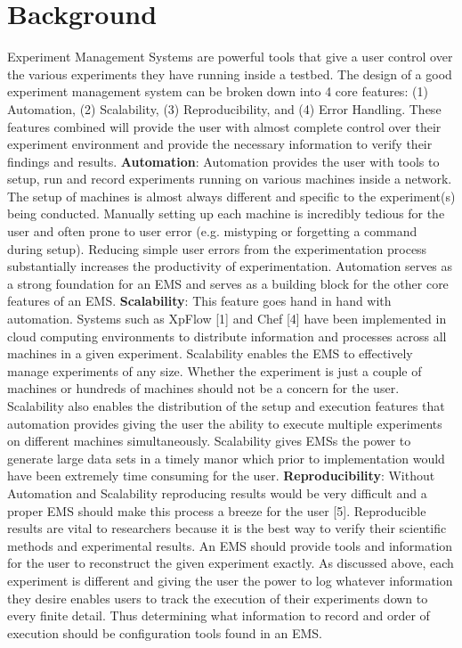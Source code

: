 \documentclass[11pt,twocolumn,letterpaper]{article}
\begin{document}
\section{Background}
Experiment Management Systems are powerful tools that give a user control over the various experiments they have running inside a testbed.  The design of a good experiment management system can be broken down into 4 core features:
(1) Automation, (2) Scalability, (3) Reproducibility, and (4) Error Handling. These features combined will provide the user with almost complete control over their experiment environment and provide the necessary information to verify their findings and results. \newline
\textbf{Automation}: Automation provides the user with tools to setup, run and record experiments running on various machines inside a network.  The setup of machines is almost always different and specific to the experiment(s) being conducted.  Manually setting up each machine is incredibly tedious for the user and often prone to user error (e.g. mistyping or forgetting a command during setup).  Reducing simple user errors from the experimentation process substantially increases the productivity of experimentation.  Automation serves as a strong foundation for an EMS and serves as a building block for the other core features of an EMS.\newline
\textbf{Scalability}:  This feature goes hand in hand with automation.  Systems such as XpFlow [1] and Chef [4] have been implemented in cloud computing environments to distribute information and processes across all machines in a given experiment.  Scalability enables the EMS to effectively manage experiments of any size.  Whether the experiment is just a couple of machines or hundreds of machines should not be a concern for the user.  Scalability also enables the distribution of the setup and execution features that automation provides giving the user the ability to execute multiple experiments on different machines simultaneously.  Scalability gives EMSs the power to generate large data sets in a timely manor which prior to implementation would have been extremely time consuming for the user.\newline
\textbf{Reproducibility}: Without Automation and Scalability reproducing results would be very difficult and a proper EMS should make this process a breeze for the user [5].  Reproducible results are vital to researchers because it is the best way to verify their scientific methods and experimental results.  An EMS should provide tools and information for the user to reconstruct the given experiment exactly. As discussed above, each experiment is different and giving the user the power to log whatever information they desire enables users to track the execution of their experiments down to every finite detail. Thus determining what information to record and order of execution should be configuration tools found in an EMS.\newline
\end{document}
